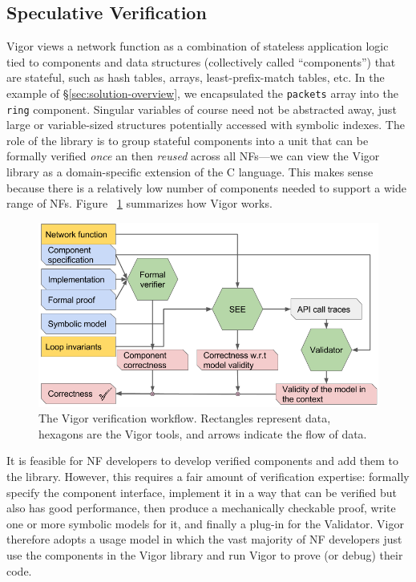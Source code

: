 \documentclass[letterpaper,twocolumn,10pt]{article}
\newcommand{\code}[1]{\lstinline{#1}}
\begin{document}
\subsection{Speculative Verification}
\label{sec:our-approach}

Vigor views a network function as a combination of stateless application logic
tied to components and data structures (collectively called ``components'') that
are stateful, such as hash tables, arrays, least-prefix-match tables, etc. In
the example of \S\ref{sec:solution-overview}, we encapsulated the \code{packets}
array into the \code{ring} component. Singular variables of course need not be
abstracted away, just large or variable-sized structures potentially accessed
with symbolic indexes. The role of the library is to group stateful components
into a unit that can be formally verified {\em once} an then {\em reused} across
all NFs---we can view the Vigor library as a domain-specific extension of the C
language. This makes sense because there is a relatively low number of
components needed to support a wide range of NFs. Figure~ \ref{fig:algo}
summarizes how Vigor works.

\begin{figure}[]
    \includegraphics[width=\columnwidth]{figures/vigor_algorithm.png}
    \caption{The Vigor verification workflow. Rectangles represent data, hexagons are the Vigor tools, and arrows indicate the flow of data.}
    \label{fig:algo}
\end{figure}

It is feasible for NF developers to develop verified components and add them to
the library. However, this requires a fair amount of verification expertise:
formally specify the component interface, implement it in a way that can be
verified but also has good performance, then produce a mechanically checkable
proof, write one or more symbolic models for it, and finally a plug-in for the
Validator. Vigor therefore adopts a usage model in which the vast majority of NF
developers just use the components in the Vigor library and run Vigor to prove
(or debug) their code.
\end{document}
